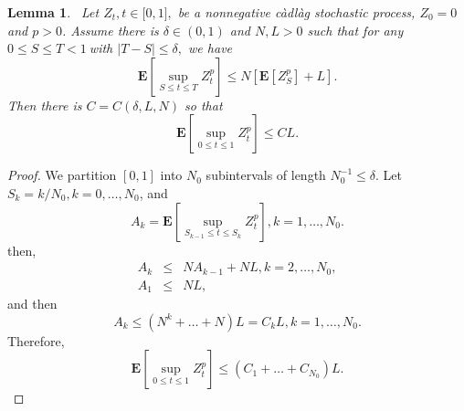 \documentclass[11pt]{amsart}
\theoremstyle{plain}
\newtheorem{lemma}{Lemma}
\numberwithin{equation}{section}
\begin{document}
\begin{lemma}
$\,$ \label{gle}Let $Z_{t},t\in \lbrack 0,1],$ be a nonnegative c\`{a}dl\`{a}g stochastic process, $Z_{0}=0$ and $p>0$. Assume there is $\delta \in
\left( 0,1\right) $ and $N,L>0$ such that for any $0\leq S\leq T<1~$with $\left\vert T-S\right\vert \leq \delta ,$ we have\begin{equation*}
\mathbf{E}\left[ \sup_{S\leq t\leq T}Z_{t}^{p}\right] \leq N[\mathbf{E}\left[
Z_{S}^{p}\right] +L].
\end{equation*}Then there is $C=C(\delta ,L,N)$ so that\begin{equation*}
\mathbf{E}\left[ \sup_{0\leq t\leq 1}Z_{t}^{p}\right] \leq CL.
\end{equation*}
\end{lemma}

\begin{proof}
We partition $[0,1]$ into $N_{0}$ subintervals of length $N_{0}^{-1}\leq
\delta $. Let $S_{k}=k/N_{0},k=0,\ldots ,N_{0}$, and\begin{equation*}
A_{k}=\mathbf{E}\left[ \sup_{S_{k-1}\leq t\leq S_{k}}Z_{t}^{p}\right]
,k=1,\ldots ,N_{0}.
\end{equation*}then, 
\begin{eqnarray*}
A_{k} &\leq &NA_{k-1}+NL,k=2,\ldots ,N_{0}, \\
A_{1} &\leq &NL,
\end{eqnarray*}
and then\begin{equation*}
A_{k}\leq \left( N^{k}+\ldots +N\right) L=C_{k}L,k=1,\ldots ,N_{0}.
\end{equation*}Therefore, 
\begin{equation*}
\mathbf{E}\left[ \sup_{0\leq t\leq 1}Z_{t}^{p}\right] \leq (C_{1}+\ldots
+C_{N_{0}})L.
\end{equation*}
\end{proof}
\end{document}

